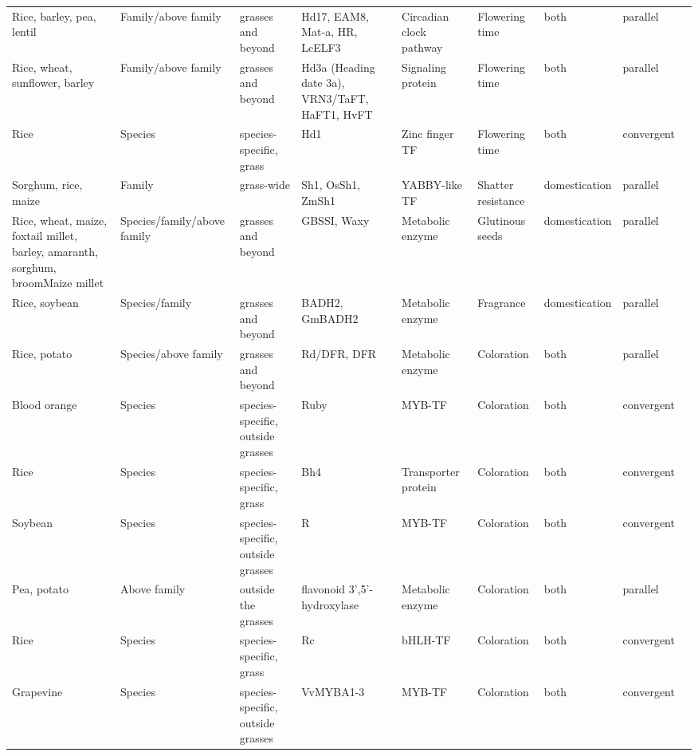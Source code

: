 \documentclass[12pt]{article}
\begin{document}
\begin{table}
\begin{center}
\begin{tabular}{G{3.5cm}G{2.5cm}C{3.10cm}C{3.5cm}C{1.95cm}G{2.0cm}G{1.8cm}G{1.5cm}G{1.5cm}}
Rice, barley, pea, lentil & Family/above family & grasses and beyond & Hd17, EAM8, Mat-a, HR, LcELF3 & Circadian clock pathway & Flowering time & both & parallel & \citep{Weller2012, Matsubara2012, Zakhrabekova2012, Faure2012}\\
Rice, wheat, sunflower, barley & Family/above family & grasses and beyond & Hd3a (Heading date 3a), VRN3/TaFT, HaFT1, HvFT & Signaling protein & Flowering time & both & parallel & \citep{Yan2006, Takahashi2009, Blackman2010}\\
Rice & Species & species-specific, grass & Hd1 & Zinc finger TF & Flowering time & both & convergent & \citep{Martin2013}\\
Sorghum, rice, maize & Family & grass-wide & Sh1, OsSh1, ZmSh1 & YABBY-like TF & Shatter resistance & domestication & parallel & \citep{Lin2012}\\
Rice, wheat, maize, foxtail millet, barley, amaranth, sorghum, broomMaize millet & Species/family/above family & grasses and beyond & GBSSI, Waxy & Metabolic enzyme & Glutinous seeds & domestication & parallel & \cite{Jeon2010, Fan2008, Kawahigashi2013, Kawase2005, Hunt2012, Park2011}\\
Rice, soybean & Species/family & grasses and beyond & BADH2, GmBADH2 & Metabolic enzyme & Fragrance & domestication & parallel & \citep{Kovach2009, Juwattanasomran2010}\\
Rice, potato & Species/above family & grasses and beyond & Rd/DFR, DFR & Metabolic enzyme & Coloration & both & parallel & \citep{Furukawa2006, Zhang2009}\\
Blood orange & Species & species-specific, outside grasses & Ruby & MYB-TF & Coloration & both & convergent & \citep{Butelli2012}\\
Rice & Species & species-specific, grass & Bh4 & Transporter protein & Coloration & both & convergent & \citep{Zhu2011}\\
Soybean & Species & species-specific, outside grasses & R & MYB-TF & Coloration & both & convergent & \citep{Gillman2011}\\
Pea, potato & Above family & outside the grasses & flavonoid 3',5'-hydroxylase & Metabolic enzyme & Coloration & both & parallel & \citep{Martin2013}\\
Rice & Species & species-specific, grass & Rc & bHLH-TF & Coloration & both & convergent & \citep{Martin2013}\\
Grapevine & Species & species-specific, outside grasses & VvMYBA1-3 & MYB-TF & Coloration & both & convergent & \citep{Martin2013}\\

\end{tabular}
\end{center}
\end{table}
\end{document}
